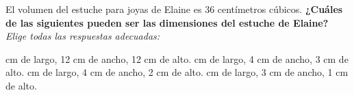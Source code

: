 El volumen del estuche para joyas de Elaine es 36 centímetros cúbicos.
\textbf{¿Cuáles de las siguientes pueden ser las dimensiones del estuche de
    Elaine?}
\emph{Elige todas las respuestas adecuadas:}

\begin{checkboxes}
     cm  de largo, 12 cm de ancho, 12 cm de alto.
     cm  de largo, 4 cm de ancho, 3 cm de alto.
     cm  de largo, 4 cm de ancho, 2 cm de alto.
     cm  de largo, 3 cm de ancho, 1 cm de alto.
\end{checkboxes}